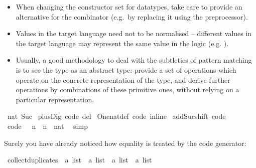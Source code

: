 \begin{isabellebody}
\begin{isamarkuptext}
  \begin{itemize}
    \item When changing the constructor set for datatypes, take care to
      provide an alternative for the  combinator (e.g.~by replacing
      it using the preprocessor).
    \item Values in the target language need not to be normalised -- different
      values in the target language may represent the same value in the
      logic (e.g. ).
    \item Usually, a good methodology to deal with the subtleties of pattern
      matching is to see the type as an abstract type: provide a set
      of operations which operate on the concrete representation of the type,
      and derive further operations by combinations of these primitive ones,
      without relying on a particular representation.
  \end{itemize}%
\end{isamarkuptext}%
\isamarkuptrue%
%
\isadeliminvisible
%
\endisadeliminvisible
%
\isataginvisible
{}\isamarkupfalse%
\ {\isachardoublequoteopen}{}{\isacharcolon}{\isacharcolon}nat{\isachardoublequoteclose}\ Suc\isanewline
{}\isamarkupfalse%
\ plus{\isacharunderscore}Dig\ {\isacharbrackleft}code\ del{\isacharbrackright}\isanewline
{}\isamarkupfalse%
\ One{\isacharunderscore}nat{\isacharunderscore}def\ {\isacharbrackleft}code\ inline{\isacharbrackright}\isanewline
{}\isamarkupfalse%
\ add{\isacharunderscore}Suc{\isacharunderscore}shift\ {\isacharbrackleft}code{\isacharbrackright}\ \isanewline
{}\isamarkupfalse%
\ {\isacharbrackleft}code{\isacharbrackright}{\isacharcolon}\ {\isachardoublequoteopen}{}\ {\isacharplus}\ n\ {\isacharequal}\ {\isacharparenleft}n\ {\isasymColon}\ nat{\isacharparenright}{\isachardoublequoteclose}\ \isamarkupfalse%
\ simp%
\endisataginvisible
{\isafoldinvisible}%
%
\isadeliminvisible
%
\endisadeliminvisible
%
\isamarkuptrue%
%
\begin{isamarkuptext}%
Surely you have already noticed how equality is treated
  by the code generator:%
\end{isamarkuptext}%
\isamarkuptrue%
%
\isadelimquoteme
%
\endisadelimquoteme
%
\isatagquoteme
{}\isamarkupfalse%
\ collect{\isacharunderscore}duplicates\ {\isacharcolon}{\isacharcolon}\ {\isachardoublequoteopen}{\isacharprime}a\ list\ {\isasymRightarrow}\ {\isacharprime}a\ list\ {\isasymRightarrow}\ {\isacharprime}a\ list\ {\isasymRightarrow}\ {\isacharprime}a\ list{\isachardoublequoteclose}\ \isanewline

\end{isabellebody}
